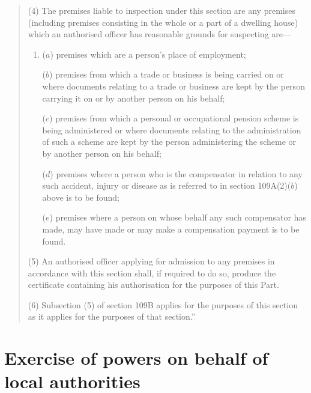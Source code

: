 \documentclass[12pt,a4paper]{article}
\begin{document}
\begin{quotation}
(4) The premises liable to inspection under this section are any premises (including premises consisting in the whole or a part of a dwelling house) which an authorised officer has reasonable grounds for suspecting are—
\begin{enumerate}\item[]
($a$) premises which are a person’s place of employment;

($b$) premises from which a trade or business is being carried on or where documents relating to a trade or business are kept by the person carrying it on or by another person on his behalf;

($c$) premises from which a personal or occupational pension scheme is being administered or where documents relating to the administration of such a scheme are kept by the person administering the scheme or by another person on his behalf;

($d$) premises where a person who is the compensator in relation to any such accident, injury or disease as is referred to in section 109A(2)($b$)  above is to be found;

($e$) premises where a person on whose behalf any such compensator has made, may have made or may make a compensation payment is to be found.
\end{enumerate}

(5) An authorised officer applying for admission to any premises in accordance with this section shall, if required to do so, produce the certificate containing his authorisation for the purposes of this Part.

(6) Subsection (5)  of section 109B applies for the purposes of this section as it applies for the purposes of that section.”
\end{quotation}

\section*{Exercise of powers on behalf of local authorities}
\end{document}
